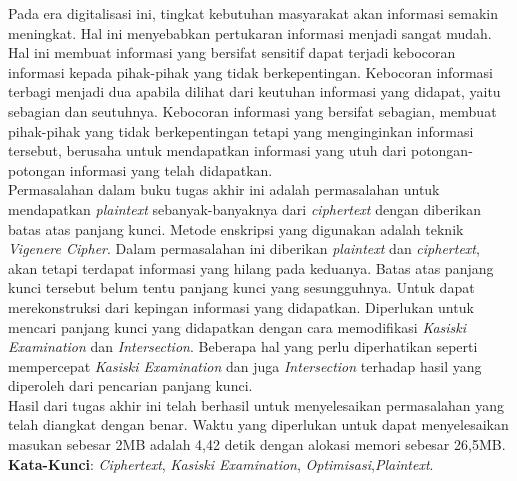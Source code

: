 \begin{abstrak}
		\indent Pada era digitalisasi ini, tingkat kebutuhan masyarakat akan informasi semakin meningkat. Hal ini menyebabkan pertukaran informasi menjadi sangat mudah. Hal ini membuat informasi yang bersifat sensitif dapat terjadi kebocoran informasi kepada pihak-pihak yang tidak berkepentingan. Kebocoran informasi terbagi menjadi dua apabila dilihat dari keutuhan informasi yang didapat, yaitu sebagian dan seutuhnya. Kebocoran informasi yang bersifat sebagian, membuat pihak-pihak yang tidak berkepentingan tetapi yang menginginkan informasi tersebut, berusaha untuk mendapatkan informasi yang utuh dari potongan-potongan informasi yang telah didapatkan. 
\\
\indent Permasalahan dalam buku tugas akhir ini adalah permasalahan untuk mendapatkan \textit{plaintext} sebanyak-banyaknya dari \textit{ciphertext} dengan diberikan batas atas panjang kunci. Metode enskripsi yang digunakan adalah  teknik \textit{Vigenere Cipher}. Dalam permasalahan ini diberikan \textit{plaintext} dan \textit{ciphertext}, akan tetapi terdapat informasi yang hilang pada keduanya. Batas atas panjang kunci tersebut belum tentu panjang kunci yang sesungguhnya. Untuk dapat merekonstruksi \plaintext dari kepingan informasi yang didapatkan. Diperlukan untuk mencari panjang kunci yang didapatkan dengan cara memodifikasi \textit{Kasiski Examination} dan \textit{Intersection}. Beberapa hal yang perlu diperhatikan seperti mempercepat \textit{Kasiski Examination} dan juga \textit{Intersection} terhadap hasil yang diperoleh dari pencarian panjang kunci.
\\  
\indent Hasil dari tugas akhir ini telah berhasil untuk menyelesaikan permasalahan yang telah diangkat dengan benar. Waktu yang diperlukan untuk dapat menyelesaikan masukan sebesar 2MB adalah 4,42 detik dengan alokasi memori sebesar 26,5MB.
\\
\noindent \textbf{Kata-Kunci}:  \textit{Ciphertext}, \textit{Kasiski Examination}, \textit{Optimisasi},\textit{Plaintext}.
\end{abstrak}


